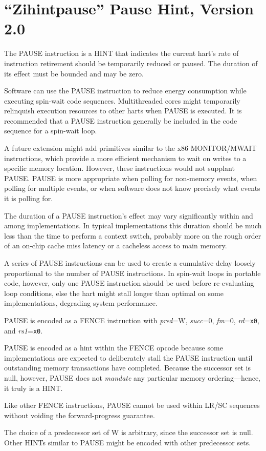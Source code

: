 \chapter{``Zihintpause'' Pause Hint, Version 2.0}
\label{chap:zihintpause}

The PAUSE instruction is a HINT that indicates the current hart's rate of
instruction retirement should be temporarily reduced or paused.  The duration of its
effect must be bounded and may be zero.

\begin{commentary}
Software can use the PAUSE instruction to reduce energy consumption while
executing spin-wait code sequences.  Multithreaded cores might temporarily
relinquish execution resources to other harts when PAUSE is executed.
It is recommended that a PAUSE instruction generally be included in the code
sequence for a spin-wait loop.

A future extension might add primitives similar to the x86 MONITOR/MWAIT
instructions, which provide a more efficient mechanism to wait on writes to
a specific memory location.
However, these instructions would not supplant PAUSE.
PAUSE is more appropriate when polling for non-memory events, when polling for
multiple events, or when software does not know precisely what events it is
polling for.

The duration of a PAUSE instruction's effect may vary significantly within and
among implementations.
In typical implementations this duration should be much less than the time to
perform a context switch, probably more on the rough order of an on-chip cache
miss latency or a cacheless access to main memory.

A series of PAUSE instructions can be used to create a cumulative delay loosely
proportional to the number of PAUSE instructions.
In spin-wait loops in portable code, however, only one PAUSE instruction should
be used before re-evaluating loop conditions, else the hart might stall longer
than optimal on some implementations, degrading system performance.
\end{commentary}

PAUSE is encoded as a FENCE instruction with {\em pred}=W, {\em succ}=0,
{\em fm}=0, {\em rd}={\tt x0}, and {\em rs1}={\tt x0}.

\begin{commentary}
PAUSE is encoded as a hint within the FENCE opcode because some
implementations are expected to deliberately stall the PAUSE instruction until outstanding
memory transactions have completed.
Because the successor set is null, however, PAUSE does not {\em mandate} any
particular memory ordering---hence, it truly is a HINT.

Like other FENCE instructions, PAUSE cannot be used within LR/SC sequences
without voiding the forward-progress guarantee.

The choice of a predecessor set of W is arbitrary, since the successor set is
null.
Other HINTs similar to PAUSE might be encoded with other predecessor sets.
\end{commentary}
